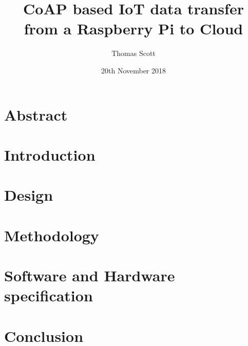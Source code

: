 \documentclass[11pt]{article}
\title{CoAP based IoT data transfer from a Raspberry Pi to Cloud}
\author{Thomas Scott}
\date{20th November 2018}
\begin{document}
	\maketitle
	\newpage

	\section{Abstract}

	\section{Introduction}
	
	

	\section{Design}
	

	\section{Methodology}
	

	\section{Software and Hardware specification}
	

	\section{Conclusion}
	

	\printglossaries

	
	
\end{document}

